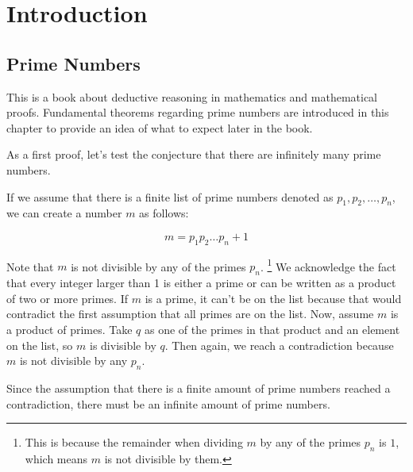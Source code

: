 \chapter{Introduction}

\section{Prime Numbers}
This is a book about deductive reasoning in mathematics and mathematical proofs. 
Fundamental theorems regarding prime numbers are introduced in this chapter to provide an idea of what to expect later in the book.


As a first proof, let's test the conjecture that there are infinitely many prime numbers.

\begin{myproof}
If we assume that there is a finite list of prime numbers denoted as $p_1, p_2, \ldots, p_n$, we can create a number $m$ as follows:

\[
m = p_1p_2 \ldots p_n + 1
\]

Note that $m$ is not divisible by any of the primes $p_n$.
\footnote{This is because the remainder when dividing $m$ by any of the primes $p_n$ is $1$, 
which means $m$ is not divisible by them.}
We acknowledge the fact that every integer larger than 1 is either a prime or can be written as a product of two or more primes. 
If $m$ is a prime, it can't be on the list because that would contradict the first assumption that all primes are on the list. 
Now, assume $m$ is a product of primes. 
Take $q$ as one of the primes in that product and an element on the list, so $m$ is divisible by $q$. 
Then again, we reach a contradiction because $m$ is not divisible by any $p_n$.

Since the assumption that there is a finite amount of prime numbers reached a contradiction, there must be an infinite amount of prime numbers.
\end{myproof}


